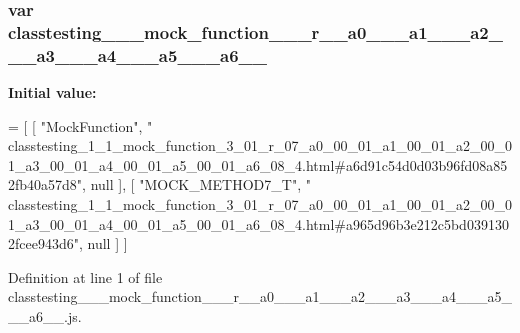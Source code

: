 \subsubsection[{\texorpdfstring{classtesting\+\_\+1\+\_\+1\+\_\+mock\+\_\+function\+\_\+3\+\_\+01\+\_\+r\+\_\+07\+\_\+a0\+\_\+00\+\_\+01\+\_\+a1\+\_\+00\+\_\+01\+\_\+a2\+\_\+00\+\_\+01\+\_\+a3\+\_\+00\+\_\+01\+\_\+a4\+\_\+00\+\_\+01\+\_\+a5\+\_\+00\+\_\+01\+\_\+a6\+\_\+08\+\_\+4}{classtesting_1_1_mock_function_3_01_r_07_a0_00_01_a1_00_01_a2_00_01_a3_00_01_a4_00_01_a5_00_01_a6_08_4}}]{\setlength{\rightskip}{0pt plus 5cm}var classtesting\+\_\+\_\+\_\+mock\+\_\+function\+\_\+\_\+\_\+r\+\_\+\_\+a0\+\_\+\_\+\_\+a1\+\_\+\_\+\_\+a2\+\_\+\_\+\_\+a3\+\_\+\_\+\_\+a4\+\_\+\_\+\_\+a5\+\_\+\_\+\_\+a6\+\_\+\_}\hypertarget{classtesting__1__1__mock__function__3__01__r__07__a0__00__01__a1__00__01__a2__00__01__a3__00__01e0a4e65c0b2a901468401ff37a542471_a0570257f877e4369c6caa0509d4b56c5}{}\label{classtesting__1__1__mock__function__3__01__r__07__a0__00__01__a1__00__01__a2__00__01__a3__00__01e0a4e65c0b2a901468401ff37a542471_a0570257f877e4369c6caa0509d4b56c5}
{\bfseries Initial value\+:}
\begin{DoxyCode}
=
[
    [ \textcolor{stringliteral}{"MockFunction"}, \textcolor{stringliteral}{"
      classtesting\_1\_1\_mock\_function\_3\_01\_r\_07\_a0\_00\_01\_a1\_00\_01\_a2\_00\_01\_a3\_00\_01\_a4\_00\_01\_a5\_00\_01\_a6\_08\_4.html#a6d91c54d0d03b96fd08a852fb40a57d8"}, null ],
    [ \textcolor{stringliteral}{"MOCK\_METHOD7\_T"}, \textcolor{stringliteral}{"
      classtesting\_1\_1\_mock\_function\_3\_01\_r\_07\_a0\_00\_01\_a1\_00\_01\_a2\_00\_01\_a3\_00\_01\_a4\_00\_01\_a5\_00\_01\_a6\_08\_4.html#a965d96b3e212c5bd0391302fcee943d6"}, null ]
]
\end{DoxyCode}


Definition at line 1 of file classtesting\+\_\+\_\+\_\+mock\+\_\+function\+\_\+\_\+\_\+r\+\_\+\_\+a0\+\_\+\_\+\_\+a1\+\_\+\_\+\_\+a2\+\_\+\_\+\_\+a3\+\_\+\_\+\_\+a4\+\_\+\_\+\_\+a5\+\_\+\_\+\_\+a6\+\_\+\_.\+js.

